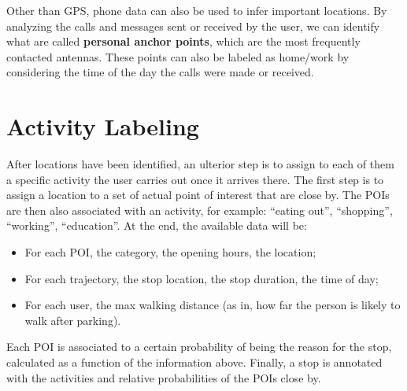 Other than GPS, phone data can also be used to infer important locations. By analyzing the calls and messages sent or received by the user, we can identify what are called \textbf{personal anchor points}, which are the most frequently contacted antennas. These points can also be labeled as home/work by considering the time of the day the calls were made or received.

\section{Activity Labeling}

After locations have been identified, an ulterior step is to assign to each of them a specific activity the user carries out once it arrives there. The first step is to assign a location to a set of actual point of interest that are close by. The POIs are then also associated with an activity, for example: ``eating out'', ``shopping'', ``working'', ``education''. At the end, the available data will be:
\begin{itemize}[itemsep=-5pt, label=-]
    \item For each POI, the category, the opening hours, the location;
    \item For each trajectory, the stop location, the stop duration, the time of day;
    \item For each user, the max walking distance (as in, how far the person is likely to walk after parking).
\end{itemize}
Each POI is associated to a certain probability of being the reason for the stop, calculated as a function of the information above. Finally, a stop is annotated with the activities and relative probabilities of the POIs close by.


